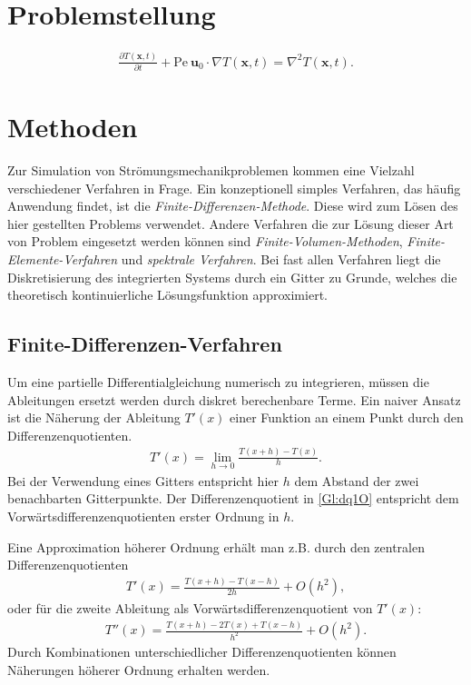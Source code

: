 \section{Problemstellung}

\begin{align}
  \frac{\partial T(\boldsymbol x, t)}{\partial t} + \text{Pe}~ \boldsymbol{u}_0\cdot \nabla T(\boldsymbol x, t) = \nabla^2 T(\boldsymbol x, t). \label{Gl:PDGL}
\end{align}

\section{Methoden}
Zur Simulation von Strömungsmechanikproblemen kommen eine Vielzahl verschiedener Verfahren in Frage.
Ein konzeptionell simples Verfahren, das häufig Anwendung findet, ist die \emph{Finite-Differenzen-Methode}.
Diese wird zum Lösen des hier gestellten Problems verwendet.
Andere Verfahren die zur Lösung dieser Art von Problem eingesetzt werden können sind \emph{Finite-Volumen-Methoden}, \emph{Finite-Elemente-Verfahren} und \emph{spektrale Verfahren}.
Bei fast allen Verfahren liegt die Diskretisierung des integrierten Systems durch ein Gitter zu Grunde, welches die theoretisch kontinuierliche Lösungsfunktion approximiert.
\subsection{Finite-Differenzen-Verfahren}
Um eine partielle Differentialgleichung numerisch zu integrieren, müssen die Ableitungen ersetzt werden durch diskret berechenbare Terme.
Ein naiver Ansatz ist die Näherung der Ableitung $T'(x)$ einer Funktion an einem Punkt durch den Differenzenquotienten.
\begin{align}
  T'(x) = \lim_{h\rightarrow 0}\frac{T(x+h)-T(x)}{h}.\label{Gl:dq1O}
\end{align}
Bei der Verwendung eines Gitters entspricht hier $h$ dem Abstand der zwei benachbarten Gitterpunkte.
Der Differenzenquotient in \cref{Gl:dq1O} entspricht dem Vorwärtsdifferenzenquotienten erster Ordnung in $h$.

Eine Approximation höherer Ordnung erhält man z.B. durch den zentralen Differenzenquotienten
\begin{align}
  T'(x) = \frac{T(x+h)-T(x-h)}{2h} + O(h^2),\label{Gl:dq2O}
\end{align}
oder für die zweite Ableitung als Vorwärtsdifferenzenquotient von $T'(x)$:
\begin{align}
  T''(x) = \frac{T(x+h)-2T(x)+T(x-h)}{h^2}+O(h^2).\label{Gl:dq2O2Abl}
\end{align}
Durch Kombinationen unterschiedlicher Differenzenquotienten können Näherungen höherer Ordnung erhalten werden.

